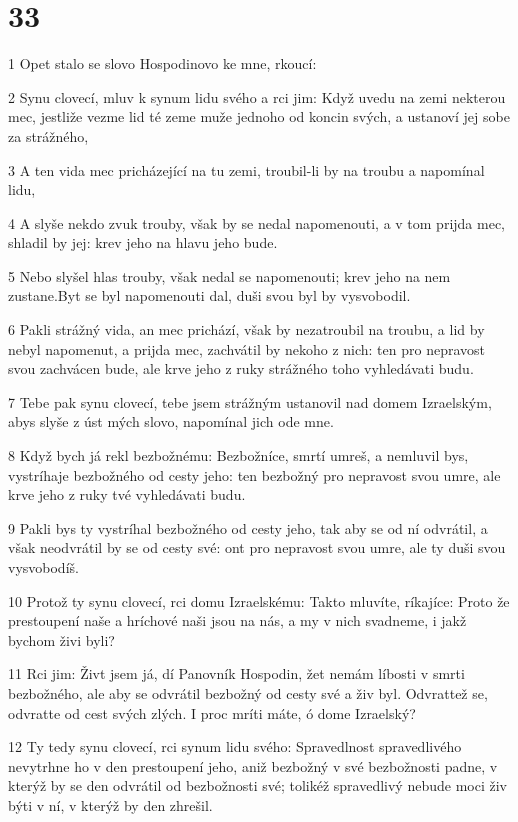 \chapter{33}

\par 1 Opet stalo se slovo Hospodinovo ke mne, rkoucí:
\par 2 Synu clovecí, mluv k synum lidu svého a rci jim: Když uvedu na zemi nekterou mec, jestliže vezme lid té zeme muže jednoho od koncin svých, a ustanoví jej sobe za strážného,
\par 3 A ten vida mec pricházející na tu zemi, troubil-li by na troubu a napomínal lidu,
\par 4 A slyše nekdo zvuk trouby, však by se nedal napomenouti, a v tom prijda mec, shladil by jej: krev jeho na hlavu jeho bude.
\par 5 Nebo slyšel hlas trouby, však nedal se napomenouti; krev jeho na nem zustane.Byt se byl napomenouti dal, duši svou byl by vysvobodil.
\par 6 Pakli strážný vida, an mec prichází, však by nezatroubil na troubu, a lid by nebyl napomenut, a prijda mec, zachvátil by nekoho z nich: ten pro nepravost svou zachvácen bude, ale krve jeho z ruky strážného toho vyhledávati budu.
\par 7 Tebe pak synu clovecí, tebe jsem strážným ustanovil nad domem Izraelským, abys slyše z úst mých slovo, napomínal jich ode mne.
\par 8 Když bych já rekl bezbožnému: Bezbožníce, smrtí umreš, a nemluvil bys, vystríhaje bezbožného od cesty jeho: ten bezbožný pro nepravost svou umre, ale krve jeho z ruky tvé vyhledávati budu.
\par 9 Pakli bys ty vystríhal bezbožného od cesty jeho, tak aby se od ní odvrátil, a však neodvrátil by se od cesty své: ont pro nepravost svou umre, ale ty duši svou vysvobodíš.
\par 10 Protož ty synu clovecí, rci domu Izraelskému: Takto mluvíte, ríkajíce: Proto že prestoupení naše a hríchové naši jsou na nás, a my v nich svadneme, i jakž bychom živi byli?
\par 11 Rci jim: Živt jsem já, dí Panovník Hospodin, žet nemám líbosti v smrti bezbožného, ale aby se odvrátil bezbožný od cesty své a živ byl. Odvrattež se, odvratte od cest svých zlých. I proc mríti máte, ó dome Izraelský?
\par 12 Ty tedy synu clovecí, rci synum lidu svého: Spravedlnost spravedlivého nevytrhne ho v den prestoupení jeho, aniž bezbožný v své bezbožnosti padne, v kterýž by se den odvrátil od bezbožnosti své; tolikéž spravedlivý nebude moci živ býti v ní, v kterýž by den zhrešil.
